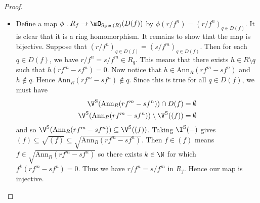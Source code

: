 \documentclass[a4paper]{article}
\begin{document}
\begin{prp}{}{}
\begin{proof}
\begin{itemize}
\item Define a map $\phi:R_f\to\mO_{\text{Spec}(R)}(D(f))$ by $\phi(r/f^n)=(r/f^n)_{q\in D(f)}$. It is clear that it is a ring homomorphism. It remains to show that the map is bijective. Suppose that $(r/f^n)_{q\in D(f)}=(s/f^m)_{q\in D(f)}$. Then for each $q\in D(f)$, we have $r/f^n=s/f^m\in R_q$. This means that there exists $h\in R\setminus q$ such that $h(rf^m-sf^n)=0$. Now notice that $h\in\text{Ann}_R(rf^m-sf^n)$ and $h\notin q$. Hence $\text{Ann}_R(rf^m-sf^n)\notin q$. Since this is true for all $q\in D(f)$, we must have 
\begin{align*}
\V^\text{S}(\text{Ann}_R(rf^m-sf^n))\cap D(f)&=\emptyset\\
\V^\text{S}(\text{Ann}_R(rf^m-sf^n))\setminus\V^\text{S}((f))&=\emptyset
\end{align*}
and so $\V^\text{S}(\text{Ann}_R(rf^m-sf^n))\subseteq\V^\text{S}((f))$. Taking $\I^\text{S}(-)$ gives $(f)\subseteq\sqrt{(f)}\subseteq\sqrt{\text{Ann}_R(rf^m-sf^n)}$. Then $f\in(f)$ means $f\in\sqrt{\text{Ann}_R(rf^m-sf^n)}$ so there exists $k\in\N$ for which $f^k(rf^m-sf^n)=0$. Thus we have $r/f^n=s/f^m$ in $R_f$. Hence our map is injective. \\


\end{itemize}
\end{proof}
\end{prp}
\end{document}
